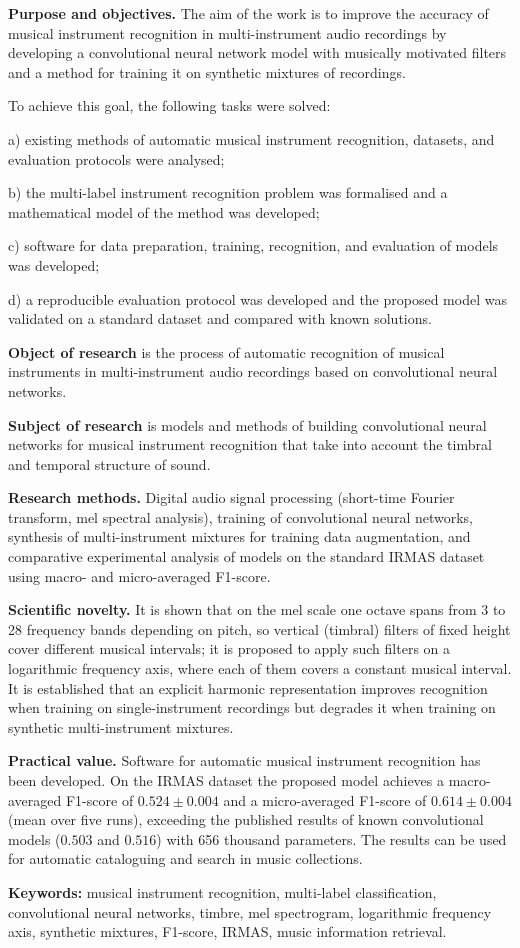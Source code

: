 \textbf{Purpose and objectives.}
The aim of the work is to improve the accuracy of musical instrument
recognition in multi-instrument audio recordings by developing a
convolutional neural network model with musically motivated filters and
a method for training it on synthetic mixtures of recordings.

To achieve this goal, the following tasks were solved:

a) existing methods of automatic musical instrument recognition,
datasets, and evaluation protocols were analysed;

b) the multi-label instrument recognition problem was formalised and a
mathematical model of the method was developed;

c) software for data preparation, training, recognition, and evaluation
of models was developed;

d) a reproducible evaluation protocol was developed and the proposed
model was validated on a standard dataset and compared with known
solutions.

\textbf{Object of research} is the process of automatic recognition of
musical instruments in multi-instrument audio recordings based on
convolutional neural networks.

\textbf{Subject of research} is models and methods of building
convolutional neural networks for musical instrument recognition that
take into account the timbral and temporal structure of sound.

\textbf{Research methods.}
Digital audio signal processing (short-time Fourier transform, mel
spectral analysis), training of convolutional neural networks, synthesis
of multi-instrument mixtures for training data augmentation, and
comparative experimental analysis of models on the standard IRMAS
dataset using macro- and micro-averaged F1-score.

\textbf{Scientific novelty.}
It is shown that on the mel scale one octave spans from 3 to 28
frequency bands depending on pitch, so vertical (timbral) filters of
fixed height cover different musical intervals; it is proposed to apply
such filters on a logarithmic frequency axis, where each of them covers
a constant musical interval. It is established that an explicit harmonic
representation improves recognition when training on single-instrument
recordings but degrades it when training on synthetic multi-instrument
mixtures.

\textbf{Practical value.}
Software for automatic musical instrument recognition has been
developed. On the IRMAS dataset the proposed model achieves a
macro-averaged F1-score of $0.524 \pm 0.004$ and a micro-averaged
F1-score of $0.614 \pm 0.004$ (mean over five runs), exceeding the
published results of known convolutional models ($0.503$ and $0.516$)
with 656 thousand parameters. The results can be used for automatic
cataloguing and search in music collections.

\textbf{Keywords:}
musical instrument recognition, multi-label classification,
convolutional neural networks, timbre, mel spectrogram, logarithmic
frequency axis, synthetic mixtures, F1-score, IRMAS, music information
retrieval.
\clearpage

\pagestyle{plain}
